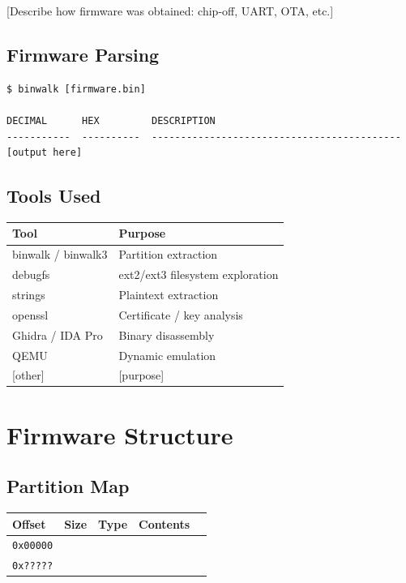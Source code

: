\documentclass[12pt,a4paper]{article}
\begin{document}
[Describe how firmware was obtained: chip-off, UART, OTA, etc.]

\subsection{Firmware Parsing}

\begin{lstlisting}
$ binwalk [firmware.bin]

DECIMAL      HEX         DESCRIPTION
-----------  ----------  -------------------------------------------
[output here]
\end{lstlisting}

\subsection{Tools Used}

\begin{tabularx}{\linewidth}{lX}
  \toprule
  \rowcolor{tabhead}\textcolor{tabheadtext}{\textbf{Tool}} &
  \textcolor{tabheadtext}{\textbf{Purpose}} \\
  \midrule
  binwalk / binwalk3  & Partition extraction \\
  \rowcolor{rowalt}
  debugfs             & ext2/ext3 filesystem exploration \\
  strings             & Plaintext extraction \\
  \rowcolor{rowalt}
  openssl             & Certificate / key analysis \\
  Ghidra / IDA Pro    & Binary disassembly \\
  \rowcolor{rowalt}
  QEMU                & Dynamic emulation \\
  {[other]}           & [purpose] \\
  \bottomrule
\end{tabularx}

\section{Firmware Structure}\label{sec:firmware-structure}

\subsection{Partition Map}

\begin{tabularx}{\linewidth}{llllX}
  \toprule
  \rowcolor{tabhead}
  \textcolor{tabheadtext}{\textbf{Offset}} &
  \textcolor{tabheadtext}{\textbf{Size}} &
  \textcolor{tabheadtext}{\textbf{Type}} &
  \textcolor{tabheadtext}{\textbf{Contents}} \\
  \midrule
  \texttt{0x00000} & & & \\
  \rowcolor{rowalt}
  \texttt{0x?????} & & & \\
  \bottomrule
\end{tabularx}
\end{document}
